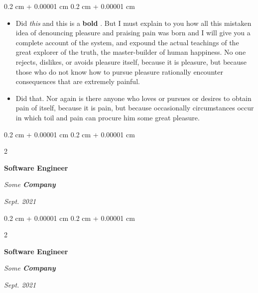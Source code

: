 \documentclass[10pt, letterpaper]{article}
\newenvironment{highlights}{
    \begin{itemize}[
        topsep=0.10 cm,
        parsep=0.10 cm,
        partopsep=0pt,
        itemsep=0pt,
        leftmargin=0.4 cm + 10pt
    ]
}{
    \end{itemize}
} %
\newenvironment{onecolentry}{
    \begin{adjustwidth}{
        0.2 cm + 0.00001 cm
    }{
        0.2 cm + 0.00001 cm
    }
}{
    \end{adjustwidth}
} %
\newenvironment{twocolentry}[2][]{
    \onecolentry
    \def\secondColumn{#2}
    \setcolumnwidth{\fill, 4.5 cm}
    \begin{paracol}{2}
}{
    \switchcolumn \raggedleft \secondColumn
    \end{paracol}
    \endonecolentry
} %
\let\hrefWithoutArrow\href
\renewcommand{\href}[2]{\hrefWithoutArrow{#1}{\mbox{\ifthenelse{\equal{#2}{}}{ }{#2 }\raisebox{.15ex}{\footnotesize \faExternalLink*}}}}
\begin{document}
        \vspace{0.10 cm-3px}
        \begin{onecolentry}
            \begin{highlights}
                \item Did \textit{this} and this is a \textbf{bold} \href{https://example.com}{link}. But I must explain to you how all this mistaken idea of denouncing pleasure and praising pain was born and I will give you a complete account of the system, and expound the actual teachings of the great explorer of the truth, the master-builder of human happiness. No one rejects, dislikes, or avoids pleasure itself, because it is pleasure, but because those who do not know how to pursue pleasure rationally encounter consequences that are extremely painful.
                \item Did that. Nor again is there anyone who loves or pursues or desires to obtain pain of itself, because it is pain, but because occasionally circumstances occur in which toil and pain can procure him some great pleasure.
            \end{highlights}
        \end{onecolentry}


        \vspace{0.2 cm-3px}

        \begin{twocolentry}{
            
            
        \textit{Sept. 2021}}
            \textbf{Software Engineer}
            
            \textit{Some \textbf{Company}}
        \end{twocolentry}



        \vspace{0.2 cm-3px}

        \begin{twocolentry}{
            
            
        \textit{Sept. 2021}}
            \textbf{Software Engineer}
            
            \textit{Some \textbf{Company}}
        \end{twocolentry}
\end{document}
